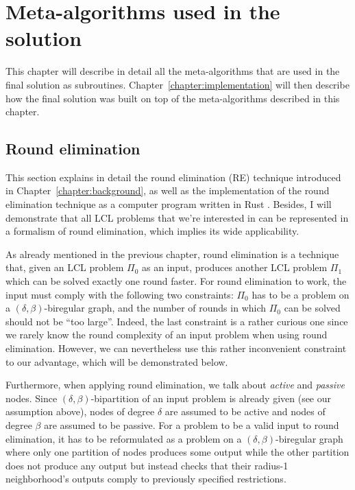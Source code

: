 \chapter{Meta-algorithms used in the\\\mbox{solution}}
\label{chapter:environment}

This chapter will describe in detail all the meta-algorithms that are
used in the final solution as subroutines.
Chapter~\ref{chapter:implementation} will then
describe how the final solution was built on top of the meta-algorithms
described in this chapter.

\section{Round elimination}

This section explains in detail the round elimination (RE)
technique introduced in Chapter~\ref{chapter:background}, as well as
the implementation of the round elimination technique as a computer
program written in Rust \cite{Brandt2019, Olivetti2020}.
Besides, I will demonstrate that all LCL problems that
we're interested in can be represented in a formalism
of round elimination, which implies
its wide applicability.

As already mentioned in the previous chapter, round elimination
is a technique that, given an LCL problem $\Pi_0$ as an input, produces
another LCL problem $\Pi_1$ which can be solved exactly one round
faster. For round elimination to work, the input must comply
with the following two constraints: $\Pi_0$ has to be a problem on a $(\delta, \beta)$-biregular
graph, and the number of rounds in which $\Pi_0$ can be solved
should not be ``too large''. Indeed, the last constraint is a rather curious one
since we rarely know the round complexity of an input problem when using
round elimination. However, we can nevertheless use this rather inconvenient constraint
to our advantage, which will be demonstrated below.

Furthermore, when applying round elimination, we talk about \emph{active} and
\emph{passive} nodes. Since $(\delta, \beta)$-bipartition of an input problem is
already given (see our assumption above), nodes of degree $\delta$ are assumed
to be active and nodes of degree $\beta$ are assumed to be passive. For a problem
to be a valid input to round elimination, it has to be reformulated as a problem on
a $(\delta, \beta)$-biregular graph where only one partition of nodes produces
some output while the other partition does not produce any output but instead
checks that their radius-1 neighborhood's outputs comply to previously
specified restrictions.

